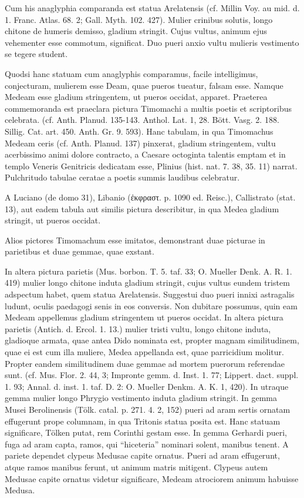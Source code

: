 \documentclass[a4paper, 11pt, oneside, polutonikogreek, german]{article}
\begin{document}
Cum his anaglyphia comparanda est statua Arelatensis (cf. Millin Voy. au mid. d. 1. Franc. Atlas. 68. 2; Gall. Myth. 102. 427). Mulier crinibus solutis, longo chitone de humeris demisso, gladium stringit. Cujus vultus, animum ejus vehementer esse commotum, significat. Duo pueri anxio vultu mulieris vestimento se tegere student.

Quodsi hanc statuam cum anaglyphis comparamus, facile intelligimus, conjecturam, mulierem esse Deam, quae pueros tueatur, falsam esse. Namque Medeam esse gladium stringentem, ut pueros occidat, apparet. Praeterea commemoranda est praeclara pictura Timomachi a multis poetis et scriptoribus celebrata. (cf. Anth. Planud. 135-143. Anthol. Lat. 1, 28. Bött. Vasg. 2. 188. Sillig. Cat. art. 450. Anth. Gr. 9. 593). Hanc tabulam, in qua Timomachus Medeam ceris (cf. Anth. Planud. 137) pinxerat, gladium stringentem, vultu acerbissimo animi dolore contracto, a Caesare octoginta talentis emptam et in templo Veneris Genitricis dedicatam esse, Plinius (hist. nat. 7. 38, 35. 11) narrat. Pulchritudo tabulae ceratae a poetis summis laudibus celebratur.

A Luciano (de domo 31), Libanio (ἐκφραστ. p. 1090 ed. Reisc.), Callistrato (stat. 13), aut eadem tabula aut similis pictura describitur, in qua Medea gladium stringit, ut pueros occidat.

Alios pictores Timomachum esse imitatos, demonstrant duae picturae in parietibus et duae gemmae, quae exstant.

In altera pictura parietis (Mus. borbon. T. 5. taf. 33; O. Mueller Denk. A. R. 1. 419) mulier longo chitone induta gladium stringit, cujus vultus eundem tristem adspectum habet, quem statua Arelatensis. Suggestui duo pueri innixi astragalis ludunt, oculis paedagogi senis in eos conversis. Non dubitare possumus, quin eam Medeam appellemus gladium stringentem ut pueros occidat. In altera pictura parietis (Antich. d. Ercol. 1. 13.) mulier tristi vultu, longo chitone induta, gladioque armata, quae antea Dido nominata est, propter magnam similitudinem, quae ei est cum illa muliere, Medea appellanda est, quae parricidium molitur. Propter eandem similitudinem duae gemmae ad mortem puerorum referendae sunt. (cf. Mus. Flor. 2. 44, 3; Impronte gemm. d. Inst. 1. 77; Lippert. dact. suppl. 1. 93; Annal. d. inst. 1. taf. D. 2: O. Mueller Denkm. A. K. 1, 420). In utraque gemma mulier longo Phrygio vestimento induta gladium stringit. In gemma Musei Berolinensis (Tölk. catal. p. 271. 4. 2, 152) pueri ad aram sertis ornatam effugerunt prope columnam, in qua Tritonis statua posita est. Hanc statuam significare, Tölken putat, rem Corinthi gestam esse. In gemma Gerhardi pueri, fuga ad aram capta, ramos, qui "`hiceteria"' nominari solent, manibus tenent. A pariete dependet clypeus Medusae capite ornatus. Pueri ad aram effugerunt, atque ramos manibus ferunt, ut animum matris mitigent. Clypeus autem Medusae capite ornatus videtur significare, Medeam atrociorem animum habuisse Medusa.
\end{document}
